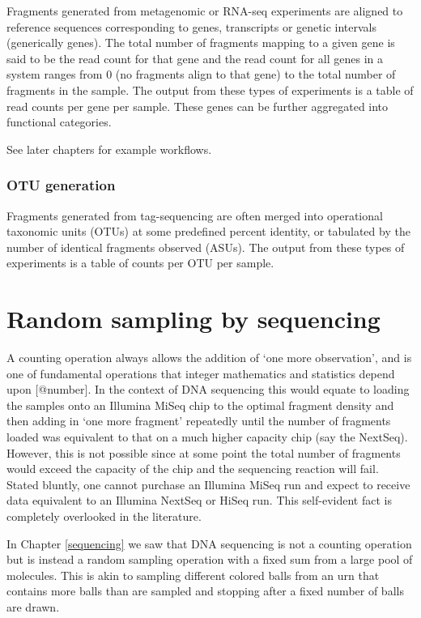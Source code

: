 \documentclass[
  onecolumn]{article}
\begin{document}
Fragments generated from metagenomic or RNA-seq experiments are aligned to reference sequences corresponding to genes, transcripts or genetic intervals (generically genes). The total number of fragments mapping to a given gene is said to be the read count for that gene and the read count for all genes in a system ranges from 0 (no fragments align to that gene) to the total number of fragments in the sample. The output from these types of experiments is a table of read counts per gene per sample. These genes can be further aggregated into functional categories.

See later chapters for example workflows.

\hypertarget{otu-generation}{%
\subsubsection{OTU generation}\label{otu-generation}}

Fragments generated from tag-sequencing are often merged into operational taxonomic units (OTUs) at some predefined percent identity, or tabulated by the number of identical fragments observed (ASUs). The output from these types of experiments is a table of counts per OTU per sample.

\clearpage

\hypertarget{random}{%
\section{Random sampling by sequencing}\label{random}}

A counting operation always allows the addition of `one more observation', and is one of fundamental operations that integer mathematics and statistics depend upon {[}@number{]}. In the context of DNA sequencing this would equate to loading the samples onto an Illumina MiSeq chip to the optimal fragment density and then adding in `one more fragment' repeatedly until the number of fragments loaded was equivalent to that on a much higher capacity chip (say the NextSeq). However, this is not possible since at some point the total number of fragments would exceed the capacity of the chip and the sequencing reaction will fail. Stated bluntly, one cannot purchase an Illumina MiSeq run and expect to receive data equivalent to an Illumina NextSeq or HiSeq run. This self-evident fact is completely overlooked in the literature.

In Chapter \ref{sequencing} we saw that DNA sequencing is not a counting operation but is instead a random sampling operation with a fixed sum from a large pool of molecules. This is akin to sampling different colored balls from an urn that contains more balls than are sampled and stopping after a fixed number of balls are drawn.
\end{document}
